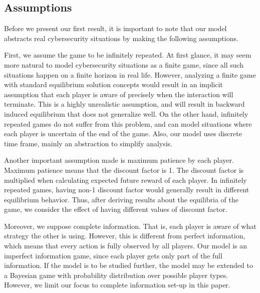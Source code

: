 \documentclass[11pt]{article}
\theoremstyle{plain}
\begin{document}
\noindent

\subsection{Assumptions}
Before we present our first result, it is important to note that our model abstracts real cybersecurity situations by making the following assumptions. 

First, we assume the game to be infinitely repeated. At first glance, it may seem more natural to model cybersecurity situations as a finite game, since all such situations happen on a finite horizon in real life. However, analyzing a finite game with standard equilibrium solution concepts would result in an implicit assumption that each player is aware of precisely when the interaction will terminate. This is a highly unrealistic assumption, and will result in backward induced equilibrium that does not generalize well. On the other hand, infinitely repeated games do not suffer from this problem, and can model situations where each player is uncertain of the end of the game. Also, our model uses discrete time frame, mainly an abstraction to simplify analysis.

Another important assumption made is maximum patience by each player. Maximum patience means that the discount factor is 1. The discount factor is multiplied when calculating expected future reward of each player. In infinitely repeated games, having non-1 discount factor would generally result in different equilibrium behavior. Thus, after deriving results about the equilibria of the game, we consider the effect of having different values of discount factor.

Moreover, we suppose complete information. That is, each player is aware of what strategy the other is using. However, this is different from perfect information, which means that every action is fully observed by all players. Our model is an imperfect information game, since each player gets only part of the full information. If the model is to be studied further, the model may be extended to a Bayesian game with probability distribution over possible player types. However, we limit our focus to complete information set-up in this paper.
\end{document}
